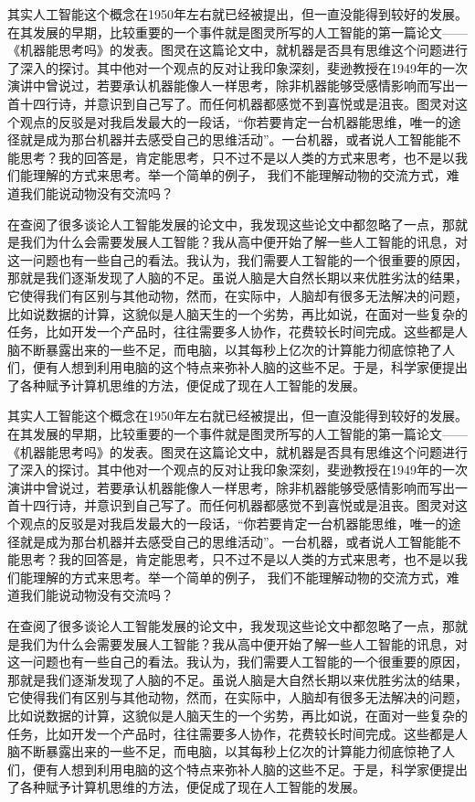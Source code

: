 \documentclass[UTF8]{XJTUthesis}
\begin{document}
其实人工智能这个概念在1950年左右就已经被提出，但一直没能得到较好的发展。在其发展的早期，比较重要的一个事件就是图灵所写的人工智能的第一篇论文——《机器能思考吗》的发表。图灵在这篇论文中，就机器是否具有思维这个问题进行了深入的探讨。其中他对一个观点的反对让我印象深刻，斐逊教授在1949年的一次演讲中曾说过，若要承认机器能像人一样思考，除非机器能够受感情影响而写出一首十四行诗，并意识到自己写了。而任何机器都感觉不到喜悦或是沮丧。图灵对这个观点的反驳是对我启发最大的一段话，“你若要肯定一台机器能思维，唯一的途径就是成为那台机器并去感受自己的思维活动”。一台机器，或者说人工智能能不能思考？我的回答是，肯定能思考，只不过不是以人类的方式来思考，也不是以我们能理解的方式来思考。举一个简单的例子， 我们不能理解动物的交流方式，难道我们能说动物没有交流吗？\par
在查阅了很多谈论人工智能发展的论文中，我发现这些论文中都忽略了一点，那就是我们为什么会需要发展人工智能？我从高中便开始了解一些人工智能的讯息，对这一问题也有一些自己的看法。我认为，我们需要人工智能的一个很重要的原因，那就是我们逐渐发现了人脑的不足。虽说人脑是大自然长期以来优胜劣汰的结果，它使得我们有区别与其他动物，然而，在实际中，人脑却有很多无法解决的问题，比如说数据的计算，这貌似是人脑天生的一个劣势，再比如说，在面对一些复杂的任务，比如开发一个产品时，往往需要多人协作，花费较长时间完成。这些都是人脑不断暴露出来的一些不足，而电脑，以其每秒上亿次的计算能力彻底惊艳了人们，便有人想到利用电脑的这个特点来弥补人脑的这些不足。于是，科学家便提出了各种赋予计算机思维的方法，便促成了现在人工智能的发展。\par
其实人工智能这个概念在1950年左右就已经被提出，但一直没能得到较好的发展。在其发展的早期，比较重要的一个事件就是图灵所写的人工智能的第一篇论文——《机器能思考吗》的发表。图灵在这篇论文中，就机器是否具有思维这个问题进行了深入的探讨。其中他对一个观点的反对让我印象深刻，斐逊教授在1949年的一次演讲中曾说过，若要承认机器能像人一样思考，除非机器能够受感情影响而写出一首十四行诗，并意识到自己写了。而任何机器都感觉不到喜悦或是沮丧。图灵对这个观点的反驳是对我启发最大的一段话，“你若要肯定一台机器能思维，唯一的途径就是成为那台机器并去感受自己的思维活动”。一台机器，或者说人工智能能不能思考？我的回答是，肯定能思考，只不过不是以人类的方式来思考，也不是以我们能理解的方式来思考。举一个简单的例子， 我们不能理解动物的交流方式，难道我们能说动物没有交流吗？\par
在查阅了很多谈论人工智能发展的论文中，我发现这些论文中都忽略了一点，那就是我们为什么会需要发展人工智能？我从高中便开始了解一些人工智能的讯息，对这一问题也有一些自己的看法。我认为，我们需要人工智能的一个很重要的原因，那就是我们逐渐发现了人脑的不足。虽说人脑是大自然长期以来优胜劣汰的结果，它使得我们有区别与其他动物，然而，在实际中，人脑却有很多无法解决的问题，比如说数据的计算，这貌似是人脑天生的一个劣势，再比如说，在面对一些复杂的任务，比如开发一个产品时，往往需要多人协作，花费较长时间完成。这些都是人脑不断暴露出来的一些不足，而电脑，以其每秒上亿次的计算能力彻底惊艳了人们，便有人想到利用电脑的这个特点来弥补人脑的这些不足。于是，科学家便提出了各种赋予计算机思维的方法，便促成了现在人工智能的发展。\par
\end{document}
